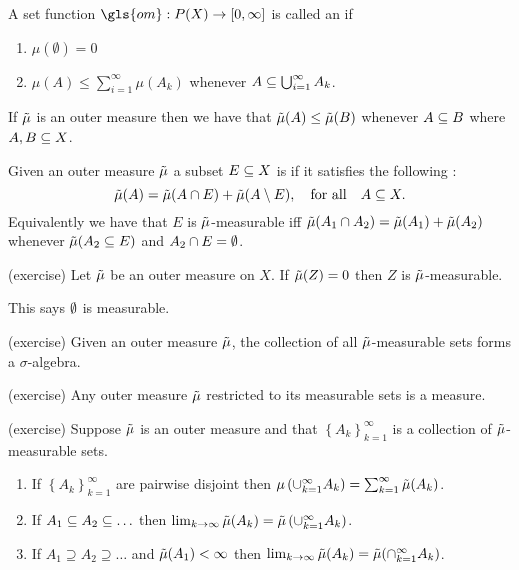 \begin{defn}
  A set function $\gls{om}:P(X)\to [0,\infty]$ is called an  if
  \begin{enumerate}
    \item $\mu(\emptyset)=0$
    \item  $\mu(A)\le \sum_{i=1}^\infty \mu(A_k)$ whenever $A\subseteq
      \bigcup_{i=1}^\infty A_k$.
  \end{enumerate}
\end{defn}

\begin{remark}
If $\tilde{\mu}$ is an outer measure then we have that $\tilde{\mu}(A)\le \tilde{\mu}(B)$
whenever $A\subseteq B$ where $A,B\subseteq X$.
\end{remark}

\begin{defn}
  Given an outer measure $\tilde{\mu}$ a subset $E\subseteq X$ is
   if it satisfies the following
  :
  \begin{equation}
   \tilde{\mu}(A) = \tilde{\mu}(A\cap E)+\tilde{\mu}(A\setminus E), \quad\text{for all}\quad A\subseteq X.
  \end{equation}
  Equivalently we have that $E$ is $\tilde{\mu}$-measurable iff
  $\tilde{\mu}(A_1\cap A_2) = \tilde{\mu}(A_1)+\tilde{\mu}(A_2)$ whenever $\tilde{\mu}(A_2\subseteq E)$ and
  $A_2\cap E=\emptyset$.
\end{defn}

\begin{prop}(exercise)
  Let $\tilde{\mu}$ be an outer measure on $X$. If $\tilde{\mu}(Z) = 0$ then $Z$ is
  $\tilde{\mu}$-measurable.
\end{prop}

\begin{note}
  This says $\emptyset$ is measurable.
\end{note}

\begin{prop}
  (exercise) Given an outer measure $\tilde{\mu}$, the collection of all
  $\tilde{\mu}$-measurable sets forms a $\sigma$-algebra.
\end{prop}

\begin{prop}(exercise)
  Any outer measure $\tilde{\mu}$ restricted to its measurable sets is a
  measure.
\end{prop}

\begin{thm}(exercise)
  Suppose $\tilde{\mu}$ is an outer measure and that $\left\{ A_k
  \right\}_{k=1}^\infty$ is a collection of $\tilde{\mu}$-measurable sets.
  \begin{enumerate}
    \item If $\left\{ A_k\right\}_{k=1}^\infty$ are pairwise disjoint then
      $\mu\left( \cup_{k=1}^\infty A_k \right) =
      \sum_{k=1}^\infty\tilde{\mu}(A_k)$.
    \item If $A_1\subseteq A_2 \subseteq \ldots$ then
      $\lim_{k\to \infty}\tilde{\mu}(A_k) = \tilde{\mu}\left( \cup_{k=1}^\infty A_k
      \right)$.
    \item If $A_1 \supseteq A_2 \supseteq \ldots$ and $\tilde{\mu}(A_1) <
      \infty$ then $\lim_{k\to \infty}\tilde{\mu}(A_k) = \tilde{\mu}(\cap_{k=1}^\infty
      A_k)$.
  \end{enumerate}
\end{thm}

